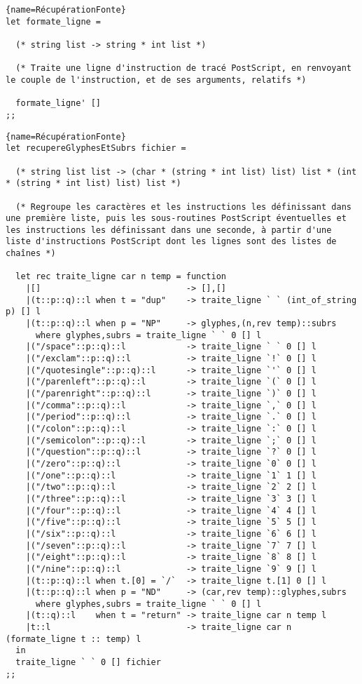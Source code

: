 \documentclass[10pt,twoside,a4paper]{article}
\begin{document}
\begin{lstlisting}{name=RécupérationFonte}
let formate_ligne =

  (* string list -> string * int list *)

  (* Traite une ligne d'instruction de tracé PostScript, en renvoyant le couple de l'instruction, et de ses arguments, relatifs *)
  
  formate_ligne' []
;;
\end{lstlisting}
\pagebreak
\begin{lstlisting}{name=RécupérationFonte}
let recupereGlyphesEtSubrs fichier =
  
  (* string list list -> (char * (string * int list) list) list * (int * (string * int list) list) list *)
  
  (* Regroupe les caractères et les instructions les définissant dans une première liste, puis les sous-routines PostScript éventuelles et les instructions les définissant dans une seconde, à partir d'une liste d'instructions PostScript dont les lignes sont des listes de chaînes *)
  
  let rec traite_ligne car n temp = function
    |[]                             -> [],[]
    |(t::p::q)::l when t = "dup"    -> traite_ligne ` ` (int_of_string p) [] l
    |(t::p::q)::l when p = "NP"     -> glyphes,(n,rev temp)::subrs
      where glyphes,subrs = traite_ligne ` ` 0 [] l
    |("/space"::p::q)::l            -> traite_ligne ` ` 0 [] l
    |("/exclam"::p::q)::l           -> traite_ligne `!` 0 [] l
    |("/quotesingle"::p::q)::l      -> traite_ligne `'` 0 [] l
    |("/parenleft"::p::q)::l        -> traite_ligne `(` 0 [] l
    |("/parenright"::p::q)::l       -> traite_ligne `)` 0 [] l
    |("/comma"::p::q)::l            -> traite_ligne `,` 0 [] l
    |("/period"::p::q)::l           -> traite_ligne `.` 0 [] l
    |("/colon"::p::q)::l            -> traite_ligne `:` 0 [] l
    |("/semicolon"::p::q)::l        -> traite_ligne `;` 0 [] l
    |("/question"::p::q)::l         -> traite_ligne `?` 0 [] l
    |("/zero"::p::q)::l             -> traite_ligne `0` 0 [] l
    |("/one"::p::q)::l              -> traite_ligne `1` 1 [] l
    |("/two"::p::q)::l              -> traite_ligne `2` 2 [] l
    |("/three"::p::q)::l            -> traite_ligne `3` 3 [] l
    |("/four"::p::q)::l             -> traite_ligne `4` 4 [] l
    |("/five"::p::q)::l             -> traite_ligne `5` 5 [] l
    |("/six"::p::q)::l              -> traite_ligne `6` 6 [] l
    |("/seven"::p::q)::l            -> traite_ligne `7` 7 [] l
    |("/eight"::p::q)::l            -> traite_ligne `8` 8 [] l
    |("/nine"::p::q)::l             -> traite_ligne `9` 9 [] l
    |(t::p::q)::l when t.[0] = `/`  -> traite_ligne t.[1] 0 [] l
    |(t::p::q)::l when p = "ND"     -> (car,rev temp)::glyphes,subrs
      where glyphes,subrs = traite_ligne ` ` 0 [] l
    |(t::q)::l    when t = "return" -> traite_ligne car n temp l
    |t::l                           -> traite_ligne car n (formate_ligne t :: temp) l
  in
  traite_ligne ` ` 0 [] fichier
;;
\end{lstlisting}
\end{document}
